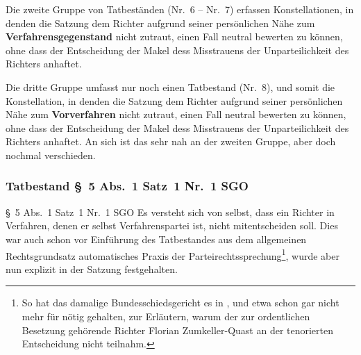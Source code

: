 Die zweite Gruppe von Tatbeständen (Nr.~6 -- Nr.~7) erfassen Konstellationen, in denden die Satzung dem Richter aufgrund seiner persönlichen Nähe zum \textbf{Verfahrensgegenstand} nicht zutraut, einen Fall neutral bewerten zu können, ohne dass der Entscheidung der Makel dess Misstrauens der Unparteilichkeit des Richters anhaftet.

Die dritte Gruppe umfasst nur noch einen Tatbestand (Nr.~8), und somit die Konstellation, in denden die Satzung dem Richter aufgrund seiner persönlichen Nähe zum \textbf{Vorverfahren} nicht zutraut, einen Fall neutral bewerten zu können, ohne dass der Entscheidung der Makel dess Misstrauens der Unparteilichkeit des Richters anhaftet. An sich ist das sehr nah an der zweiten Gruppe, aber doch nochmal verschieden.

\subsubsection{Tatbestand \S~5 Abs.~1 Satz~1 Nr.~1 SGO}
\label{Zusammensetzung:Spruchkoerper:Befangenheitsvermutung:Nr1}
\S~5 Abs.~1 Satz~1 Nr.~1 SGO
Es versteht sich von selbst, dass ein Richter in Verfahren, denen er selbst Verfahrenspartei ist, nicht mitentscheiden soll.
Dies war auch schon vor Einführung des Tatbestandes aus dem allgemeinen Rechtsgrundsatz automatisches Praxis der Parteirechtssprechung\footnote{So hat das damalige Bundesschiedsgericht es in \cite{BSG3014HS}, \cite{BSG4414HS} und \cite{BSG3215HS} etwa schon gar nicht mehr für nötig gehalten, zur Erläutern, warum der zur ordentlichen Besetzung gehörende Richter Florian Zumkeller-Quast an der tenorierten Entscheidung nicht teilnahm.}, wurde aber nun explizit in der Satzung festgehalten.

